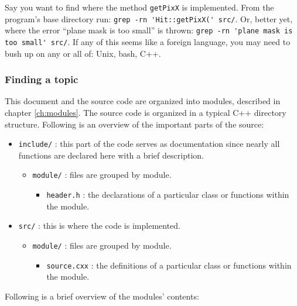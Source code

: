\documentclass[10pt,a4paper]{book}
\begin{document}
Say you want to find where the method \Verb`getPixX` is implemented. From the program's base directory run: \Verb`grep -rn 'Hit::getPixX(' src/`. Or, better yet, where the error ``plane mask is too small'' is thrown: \Verb`grep -rn 'plane mask is too small' src/`. If any of this seems like a foreign language, you may need to bush up on any or all of: Unix, bash, C++.

\subsubsection*{Finding a topic}

This document and the source code are organized into modules, described in chapter \ref{ch:modules}. The source code is organized in a typical C++ directory structure. Following is an overview of the important parts of the source:

\begin{itemize}
	\item \Verb`include/` : this part of the code serves as documentation since nearly all functions are declared here with a brief description.
	\begin{itemize}
		\item \Verb`module/` : files are grouped by module.
		\begin{itemize}
			\item \Verb`header.h` : the declarations of a particular class or functions within the module.
		\end{itemize}
	\end{itemize}
	\item \Verb`src/` : this is where the code is implemented.
	\begin{itemize}
		\item \Verb`module/` : files are grouped by module.
		\begin{itemize}
			\item \Verb`source.cxx` : the definitions of a particular class or functions within the module.
		\end{itemize}
	\end{itemize}
\end{itemize}

Following is a brief overview of the modules' contents:
\end{document}
